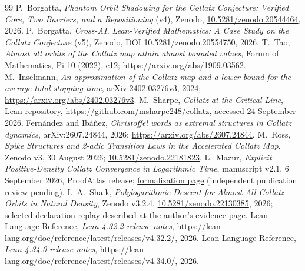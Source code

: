 \documentclass[11pt,a4paper]{article}
\theoremstyle{definition}
\begin{document}
\begingroup\small
\begin{thebibliography}{99}
P.~Borgatta, \emph{Phantom Orbit Shadowing for the Collatz Conjecture:
Verified Core, Two Barriers, and a Repositioning} (v4), Zenodo,
\href{https://doi.org/10.5281/zenodo.20544464}{10.5281/zenodo.20544464},
2026.
P.~Borgatta, \emph{Cross-AI, Lean-Verified Mathematics: A Case Study on
the Collatz Conjecture} (v5), Zenodo, DOI
\href{https://doi.org/10.5281/zenodo.20554750}{10.5281/zenodo.20554750},
2026.
T.~Tao, \emph{Almost all orbits of the Collatz map attain almost bounded
values}, Forum of Mathematics, Pi 10 (2022), e12;
\url{https://arxiv.org/abs/1909.03562}.
M.~Inselmann, \emph{An approximation of the Collatz map and a lower bound
for the average total stopping time}, arXiv:2402.03276v3, 2024;
\url{https://arxiv.org/abs/2402.03276v3}.
M.~Sharpe, \emph{Collatz at the Critical Line}, Lean repository,
\url{https://github.com/msharpe248/collatz}, accessed 24 September 2026.
Fern\'andez and Ib\'a\~nez, \emph{Christoffel words as extremal structures
in Collatz dynamics}, arXiv:2607.24844, 2026;
\url{https://arxiv.org/abs/2607.24844}.
M.~Ross, \emph{Spike Structures and 2-adic Transition Laws in the
Accelerated Collatz Map}, Zenodo v3, 30 August 2026;
\href{https://doi.org/10.5281/zenodo.22181823}{10.5281/zenodo.22181823}.
L.~Mazur, \emph{Explicit Positive-Density Collatz Convergence in
Logarithmic Time}, manuscript v2.1, 6 September 2026, ProofAtlas release;
\href{https://www.proofatlas.ai/formalizations/positive-density-log-time-collatz/}{formalization page}
(independent publication review pending).
I.~A.~Shaik, \emph{Polylogarithmic Descent for Almost All Collatz Orbits in
Natural Density}, Zenodo v3.2.4,
\href{https://doi.org/10.5281/zenodo.22130385}{10.5281/zenodo.22130385},
2026; selected-declaration replay described at
\href{https://shaikidris.github.io/}{the author's evidence page}.
Lean Language Reference, \emph{Lean 4.32.2 release notes},
\url{https://lean-lang.org/doc/reference/latest/releases/v4.32.2/}, 2026.
Lean Language Reference, \emph{Lean 4.34.0 release notes},
\url{https://lean-lang.org/doc/reference/latest/releases/v4.34.0/}, 2026.
\end{thebibliography}
\endgroup
\end{document}
